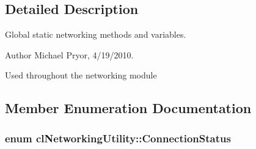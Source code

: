 \subsection{Detailed Description}
Global static networking methods and variables. \begin{DoxyAuthor}{Author}
Michael Pryor, 4/19/2010.
\end{DoxyAuthor}
Used throughout the networking module 

\subsection{Member Enumeration Documentation}
\hypertarget{classcl_networking_utility_a15dd34683154e07d5843f8f5432fec6d}{
\subsubsection[{ConnectionStatus}]{\setlength{\rightskip}{0pt plus 5cm}enum {\bf clNetworkingUtility::ConnectionStatus}}}
\label{classcl_networking_utility_a15dd34683154e07d5843f8f5432fec6d}
